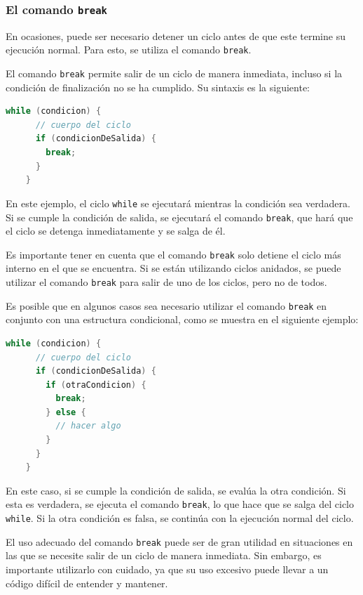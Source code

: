 \documentclass[executivepaper]{article}
\begin{document}
\subsubsection{El comando \texttt{break}}

    En ocasiones, puede ser necesario detener un ciclo antes de que este termine su ejecución normal. Para esto, se utiliza el comando \texttt{break}.
    
    El comando \texttt{break} permite salir de un ciclo de manera inmediata, incluso si la condición de finalización no se ha cumplido. Su sintaxis es la siguiente:
    
    \begin{lstlisting}[language=Java]
    while (condicion) {
      // cuerpo del ciclo
      if (condicionDeSalida) {
        break;
      }
    }
    \end{lstlisting}
    
    En este ejemplo, el ciclo \texttt{while} se ejecutará mientras la condición sea verdadera. Si se cumple la condición de salida, se ejecutará el comando \texttt{break}, que hará que el ciclo se detenga inmediatamente y se salga de él.
    
    Es importante tener en cuenta que el comando \texttt{break} solo detiene el ciclo más interno en el que se encuentra. Si se están utilizando ciclos anidados, se puede utilizar el comando \texttt{break} para salir de uno de los ciclos, pero no de todos.
    
    Es posible que en algunos casos sea necesario utilizar el comando \texttt{break} en conjunto con una estructura condicional, como se muestra en el siguiente ejemplo:
    
    \begin{lstlisting}[language=Java]
    while (condicion) {
      // cuerpo del ciclo
      if (condicionDeSalida) {
        if (otraCondicion) {
          break;
        } else {
          // hacer algo
        }
      }
    }
    \end{lstlisting}
    
    En este caso, si se cumple la condición de salida, se evalúa la otra condición. Si esta es verdadera, se ejecuta el comando \texttt{break}, lo que hace que se salga del ciclo \texttt{while}. Si la otra condición es falsa, se continúa con la ejecución normal del ciclo.
    
    El uso adecuado del comando \texttt{break} puede ser de gran utilidad en situaciones en las que se necesite salir de un ciclo de manera inmediata. Sin embargo, es importante utilizarlo con cuidado, ya que su uso excesivo puede llevar a un código difícil de entender y mantener.
    
\end{document}
